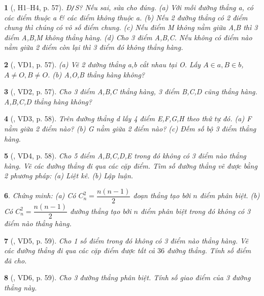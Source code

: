 \documentclass{article}
\newtheorem{baitoan}{}
\begin{document}
\begin{baitoan}[\cite{Binh_boi_duong_Toan_6_tap_2}, H1--H4, p. 57]
	{\rm Đ{\tt/}S?} Nếu sai, sửa cho đúng. (a) Với mỗi đường thẳng a, có các điểm thuộc a \& các điểm không thuộc a. (b) Nếu 2 đường thẳng có 2 điểm chung thì chúng có vô số điểm chung. (c) Nếu điểm M không nằm giữa A,B thì 3 điểm A,B,M không thẳng hàng. (d) Cho 3 điểm A,B,C. Nếu không có điểm nào nằm giữa 2 điểm còn lại thì 3 điểm đó không thẳng hàng.
\end{baitoan}

\begin{baitoan}[\cite{Binh_boi_duong_Toan_6_tap_2}, VD1, p. 57]
	(a) Vẽ 2 đường thẳng a,b cắt nhau tại O. Lấy $A\in a,B\in b$, $A\ne O,B\ne O$. (b) A,O,B thẳng hàng không?
\end{baitoan}

\begin{baitoan}[\cite{Binh_boi_duong_Toan_6_tap_2}, VD2, p. 57]
	Cho 3 điểm A,B,C thẳng hàng, 3 điểm B,C,D cũng thẳng hàng. A,B,C,D thẳng hàng không?
\end{baitoan}

\begin{baitoan}[\cite{Binh_boi_duong_Toan_6_tap_2}, VD3, p. 58]
	Trên đường thẳng d lấy 4 điểm E,F,G,H theo thứ tự đó. (a) F nằm giữa 2 điểm nào? (b) G nằm giữa 2 điểm nào? (c) Đếm số bộ 3 điểm thẳng hàng.
\end{baitoan}

\begin{baitoan}[\cite{Binh_boi_duong_Toan_6_tap_2}, VD4, p. 58]
	Cho 5 điểm A,B,C,D,E trong đó không có 3 điểm nào thẳng hàng. Vẽ các đường thẳng đi qua các cặp điểm. Tìm số đường thẳng vẽ được bằng 2 phương pháp: (a) Liệt kê. (b) Lập luận.
\end{baitoan}

\begin{baitoan}
	Chứng minh: (a) Có $C_n^2 = \dfrac{n(n - 1)}{2}$ đoạn thẳng tạo bởi $n$ điểm phân biệt. (b) Có $C_n^2 = \dfrac{n(n - 1)}{2}$ đường thẳng tạo bởi $n$ điểm phân biệt trong đó không có 3 điểm nào thẳng hàng.
\end{baitoan}

\begin{baitoan}[\cite{Binh_boi_duong_Toan_6_tap_2}, VD5, p. 59]
	Cho 1 số điểm trong đó không có 3 điểm nào thẳng hàng. Vẽ các đường thẳng đi qua các cặp điểm được tất cả $36$ đường thẳng. Tính số điểm đã cho.
\end{baitoan}

\begin{baitoan}[\cite{Binh_boi_duong_Toan_6_tap_2}, VD6, p. 59]
	Cho 3 đường thẳng phân biệt. Tính số giao điểm của 3 đường thẳng này.
\end{baitoan}
\end{document}
